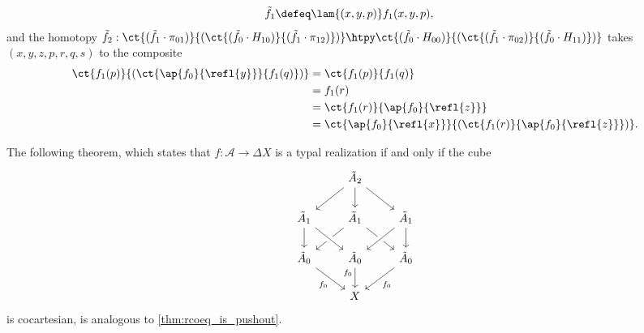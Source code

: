 \begin{defn}
\begin{align*}
\tilde{f}_1 & \defeq \lam{(x,y,p)}f_1(x,y,p),
\end{align*}
and the homotopy $\tilde{f}_2:\ct{(\tilde{f}_1\cdot \pi_{01})}{(\ct{(\tilde{f}_0\cdot H_{10})}{(\tilde{f}_1\cdot \pi_{12})})}\htpy \ct{(\tilde{f}_0\cdot H_{00})}{(\ct{(\tilde{f}_1\cdot\pi_{02})}{(\tilde{f}_0\cdot H_{11})})}$ takes $(x,y,z,p,r,q,s)$ to the composite
\begin{align*}
\ct{f_1(p)}{(\ct{\ap{f_0}{\refl{y}}}{f_1(q)})} & = \ct{f_1(p)}{f_1(q)} \\
& = f_1(r) \\
& = \ct{f_1(r)}{\ap{f_0}{\refl{z}}} \\
& = \ct{\ap{f_0}{\refl{x}}}{(\ct{f_1(r)}{\ap{f_0}{\refl{z}}})}.
\end{align*}
\end{defn}

\begin{comment}
\begin{lem}
Consider a $2$-semi-simplicial type $\mathcal{A}$
\begin{align*}
A_0 & : \UU \\
A_1 & : A_0\to A_0\to \UU \\
A_2 & : \prd{x,y,z:A_0} A_1(x,y)\to A_1(x,z)\to A_1(y,z)\to \UU,
\end{align*}
and consider
\begin{align*}
\alpha & : \prd{x,y:A_0} A_1(x,y)\to (x=y) \\
\beta & : \prd{x,y,z:A_0}{p:A_1(x,y)}{r:A_1(x,z)}{q:A_1(y,z)} A_2(p,r,q)\to (\ct{\alpha(p)}{\alpha(q)}=\alpha(r)). 
\end{align*}
Then the function $(x,y,z,p,q,r,s)\mapsto(x,x,x,y,y,y,z)$ of type
\begin{align*}
\cdots \to \tilde{A}_2
\end{align*}
is an equivalence. 
\end{lem}
\end{comment}

The following theorem, which states that $f:\mathcal{A}\to \Delta X$ is a typal realization if and only if the cube
\begin{equation*}
\begin{tikzcd}
& \tilde A_2 \arrow[dl] \arrow[d] \arrow[dr] \\
\tilde A_1 \arrow[d] & \tilde A_1 \arrow[dl] \arrow[dr] & \tilde A_1 \arrow[dl,crossing over] \arrow[d] \\
\tilde A_0 \arrow[dr,swap,"f_0"] & \tilde A_0 \arrow[from=ul,crossing over] \arrow[d,swap,"f_0" near start] & \tilde A_0  \arrow[dl,"f_0"] \\
& X
\end{tikzcd}
\end{equation*}
is cocartesian, is analogous to \cref{thm:rcoeq_is_pushout}.

